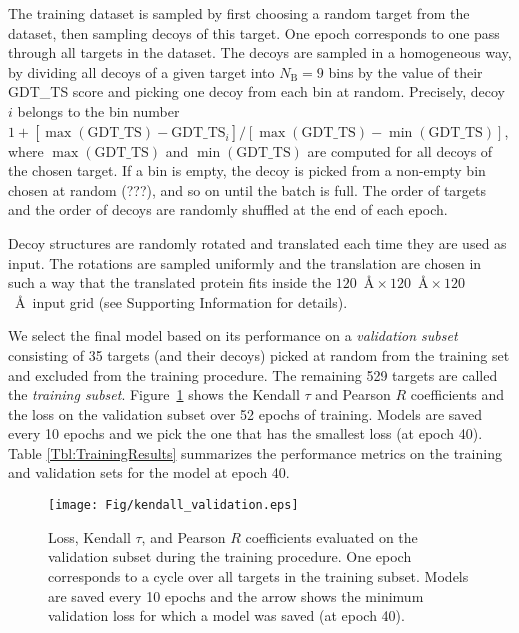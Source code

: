 The training dataset is sampled by first choosing a random target from
the dataset, then sampling decoys of this target. One epoch
corresponds to one pass through all targets in the dataset. The decoys
are sampled in a homogeneous way, by dividing all decoys of a given
target into $N_\text{B} = 9$ bins by the value of their GDT\_TS score
and picking one decoy from each bin at random.
%
Precisely, decoy $i$ belongs to the bin number $1 + \left[
  \max(\text{GDT\_TS}) - \text{GDT\_TS}_i \right] / \left[
  \max(\text{GDT\_TS}) - \min(\text{GDT\_TS}) \right]$, where
$\max(\text{GDT\_TS})$ and $\min(\text{GDT\_TS})$ are computed for all
decoys of the chosen target.
%
If a bin is empty, the decoy is picked from a non-empty bin chosen at
random (???), and so on until the batch is full. The order of targets
and the order of decoys are randomly shuffled at the end of each
epoch.

Decoy structures are randomly rotated and translated each time they
are used as input. The rotations are sampled uniformly
\cite{shoemake1992uniform} and the translation are chosen in such a
way that the translated protein fits inside the $120$~\AA${}\times
120$~\AA${}\times 120$~\AA\ input grid (see Supporting Information for
details).

We select the final model based on its performance on a
\emph{validation subset} consisting of 35 targets (and their decoys)
picked at random from the training set and excluded from the training
procedure. The remaining 529 targets are called the \emph{training
subset}.  Figure~\ref{Fig:TrainingLoss} shows the Kendall $\tau$ and
Pearson $R$ coefficients and the loss on the validation subset over 52
epochs of training.  Models are saved every 10 epochs and we pick the
one that has the smallest loss (at epoch 40).
%
Table \ref{Tbl:TrainingResults} summarizes the performance metrics on
the training and validation sets for the model at epoch 40.

\begin{figure}[H]
    \centering
    \texttt{[image: Fig/kendall\_validation.eps]}
%
    \caption{Loss, Kendall $\tau$, and Pearson $R$ coefficients
      evaluated on the validation subset during the training
      procedure.  One epoch corresponds to a cycle over all targets in
      the training subset. Models are saved every 10 epochs and the
      arrow shows the minimum validation loss for which a model was
      saved (at epoch 40).}
%
    \label{Fig:TrainingLoss}
\end{figure}

